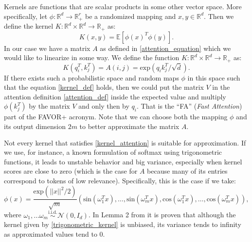 \documentclass[magisterska,en]{pracamgr}
\begin{document}
Kernels are functions that are scalar products in some other vector space. More specifically, let $\phi : \mathbb{R}^d \rightarrow \mathbb{R}^r_+$ be a randomized mapping and $x, y \in \mathbb{R}^d$. Then we define the kernel $K:\mathbb{R}^d \times \mathbb{R}^d \rightarrow \mathbb{R}_+$ as:
\begin{equation}
    K(x,y) = \mathbb{E} \left[\phi(x)^T\phi(y)\right].
\label{kernel_def}\end{equation}
In our case we have a matrix $A$ as defined in \ref{attention_equation} which we would like to linearize in some way. We define the function $K:\mathbb{R}^d \times \mathbb{R}^d \rightarrow \mathbb{R}_+$ as:
\begin{equation}
    K(q_i^T, k_j^T) = A(i,j) = \textrm{exp}\left(q_i k_j^T/\sqrt{d}\right).
\label{kernel_attention}\end{equation}
If there exists such a probabilistic space and random maps $\phi$ in this space such that the equation \ref{kernel_def} holds, then we could put the matrix $V$ in the attention definition \ref{attention_def} inside the expected value and multiply $\phi(k_j^T)$ by the matrix $V$ and only then by $q_i$. That is the ``FA'' (\textit{Fast Attention}) part of the FAVOR+ acronym.
Note that we can choose both the mapping $\phi$ and its output dimension $2m$ to better approximate the matrix $A$.


Not every kernel that satisfies \ref{kernel_attention} is suitable for approximation. If we use, for instance, a known formulation of softmax using trigonometric functions, it leads to unstable behavior and big variance, especially when kernel scores are close to zero (which is the case for $A$ because many of its entries correspond to tokens of low relevance). Specifically, this is the case if we take:
\begin{equation}
    \phi(x) = \frac{\textrm{exp}(||x||^2/2)}{\sqrt{m}}\left(\textrm{sin}(\omega _1^T x), \ldots, \textrm{sin}(\omega _m^T x), \textrm{cos}(\omega _1^T x), \ldots, \textrm{cos}(\omega _m^T x)\right),
\label{trigonometric_kernel}\end{equation}
where $\omega _1, \ldots \omega _m \stackrel{\textrm{i.i.d.}}{\sim} \mathcal{N}(0, I_d)$. In Lemma 2 from \cite{DBLP:conf/iclr/ChoromanskiLDSG21} it is proven that although the kernel given by \ref{trigonometric_kernel} is unbiased, its variance tends to infinity as approximated values tend to 0.
\end{document}
